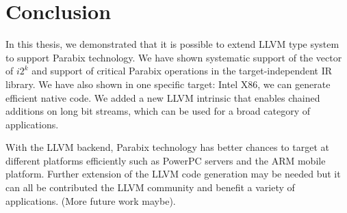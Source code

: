 %
%

\chapter{Conclusion}
\label{seven}

In this thesis, we demonstrated that it is possible to extend LLVM type system to support Parabix technology. We have shown systematic support of the vector of $i2^k$ and support of critical Parabix operations in the target-independent IR library. We have also shown in one specific target: Intel X86, we can generate efficient native code. We added a new LLVM intrinsic that enables chained additions on long bit streams, which can be used for a broad category of applications.

With the LLVM backend, Parabix technology has better chances to target at different platforms efficiently such as PowerPC servers and the ARM mobile platform. Further extension of the LLVM code generation may be needed but it can all be contributed the LLVM community and benefit a variety of applications. (More future work maybe).

